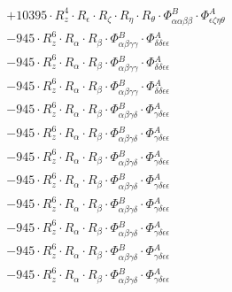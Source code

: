 \documentclass{article}
\begin{document}
\begin{subequations}
\begin{gather}
\begin{array}{c}
 \\[0.2em] 		 + 10395 \cdot R_{z}^{4} \cdot R_{\epsilon{}} \cdot R_{\zeta{}} \cdot R_{\eta{}} \cdot R_{\theta{}} \cdot \Phi{}^{B}_{\alpha{}\alpha{}\beta{}\beta{}} \cdot \Phi{}^{A}_{\epsilon{}\zeta{}\eta{}\theta{}} 
 \\[0.2em] 		 - 945 \cdot R_{z}^{6} \cdot R_{\alpha{}} \cdot R_{\beta{}} \cdot \Phi{}^{B}_{\alpha{}\beta{}\gamma{}\gamma{}} \cdot \Phi{}^{A}_{\delta{}\delta{}\epsilon{}\epsilon{}} 
 \\[0.2em] 		 - 945 \cdot R_{z}^{6} \cdot R_{\alpha{}} \cdot R_{\beta{}} \cdot \Phi{}^{B}_{\alpha{}\beta{}\gamma{}\gamma{}} \cdot \Phi{}^{A}_{\delta{}\delta{}\epsilon{}\epsilon{}} 
 \\[0.2em] 		 - 945 \cdot R_{z}^{6} \cdot R_{\alpha{}} \cdot R_{\beta{}} \cdot \Phi{}^{B}_{\alpha{}\beta{}\gamma{}\gamma{}} \cdot \Phi{}^{A}_{\delta{}\delta{}\epsilon{}\epsilon{}} 
 \\[0.2em] 		 - 945 \cdot R_{z}^{6} \cdot R_{\alpha{}} \cdot R_{\beta{}} \cdot \Phi{}^{B}_{\alpha{}\beta{}\gamma{}\delta{}} \cdot \Phi{}^{A}_{\gamma{}\delta{}\epsilon{}\epsilon{}} 
 \\[0.2em] 		 - 945 \cdot R_{z}^{6} \cdot R_{\alpha{}} \cdot R_{\beta{}} \cdot \Phi{}^{B}_{\alpha{}\beta{}\gamma{}\delta{}} \cdot \Phi{}^{A}_{\gamma{}\delta{}\epsilon{}\epsilon{}} 
 \\[0.2em] 		 - 945 \cdot R_{z}^{6} \cdot R_{\alpha{}} \cdot R_{\beta{}} \cdot \Phi{}^{B}_{\alpha{}\beta{}\gamma{}\delta{}} \cdot \Phi{}^{A}_{\gamma{}\delta{}\epsilon{}\epsilon{}} 
 \\[0.2em] 		 - 945 \cdot R_{z}^{6} \cdot R_{\alpha{}} \cdot R_{\beta{}} \cdot \Phi{}^{B}_{\alpha{}\beta{}\gamma{}\delta{}} \cdot \Phi{}^{A}_{\gamma{}\delta{}\epsilon{}\epsilon{}} 
 \\[0.2em] 		 - 945 \cdot R_{z}^{6} \cdot R_{\alpha{}} \cdot R_{\beta{}} \cdot \Phi{}^{B}_{\alpha{}\beta{}\gamma{}\delta{}} \cdot \Phi{}^{A}_{\gamma{}\delta{}\epsilon{}\epsilon{}} 
 \\[0.2em] 		 - 945 \cdot R_{z}^{6} \cdot R_{\alpha{}} \cdot R_{\beta{}} \cdot \Phi{}^{B}_{\alpha{}\beta{}\gamma{}\delta{}} \cdot \Phi{}^{A}_{\gamma{}\delta{}\epsilon{}\epsilon{}} 
 \\[0.2em] 		 - 945 \cdot R_{z}^{6} \cdot R_{\alpha{}} \cdot R_{\beta{}} \cdot \Phi{}^{B}_{\alpha{}\beta{}\gamma{}\delta{}} \cdot \Phi{}^{A}_{\gamma{}\delta{}\epsilon{}\epsilon{}} 
 \\[0.2em] 		 - 945 \cdot R_{z}^{6} \cdot R_{\alpha{}} \cdot R_{\beta{}} \cdot \Phi{}^{B}_{\alpha{}\beta{}\gamma{}\delta{}} \cdot \Phi{}^{A}_{\gamma{}\delta{}\epsilon{}\epsilon{}} 

\end{array}
\end{gather}
\end{subequations}
\end{document}
